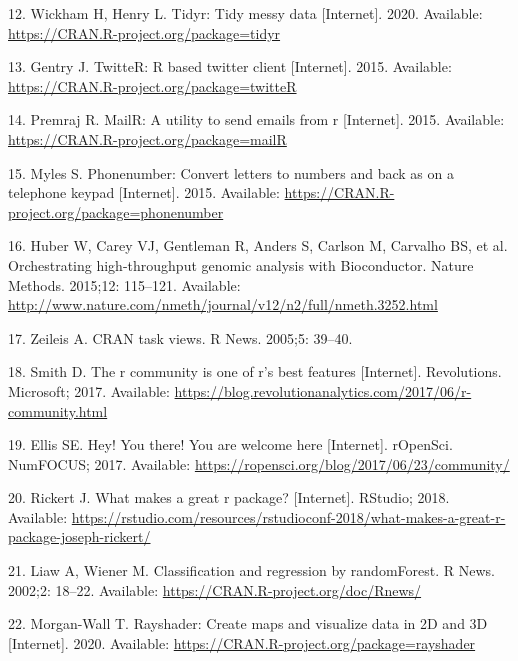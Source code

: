 \documentclass[10pt,letterpaper]{article}
\begin{document}
\leavevmode\hypertarget{ref-tidyr}{}%
12. Wickham H, Henry L. Tidyr: Tidy messy data {[}Internet{]}. 2020.
Available: \url{https://CRAN.R-project.org/package=tidyr}

\leavevmode\hypertarget{ref-twitteR}{}%
13. Gentry J. TwitteR: R based twitter client {[}Internet{]}. 2015.
Available: \url{https://CRAN.R-project.org/package=twitteR}

\leavevmode\hypertarget{ref-mailR}{}%
14. Premraj R. MailR: A utility to send emails from r {[}Internet{]}.
2015. Available: \url{https://CRAN.R-project.org/package=mailR}

\leavevmode\hypertarget{ref-phonenumber}{}%
15. Myles S. Phonenumber: Convert letters to numbers and back as on a
telephone keypad {[}Internet{]}. 2015. Available:
\url{https://CRAN.R-project.org/package=phonenumber}

\leavevmode\hypertarget{ref-bioCproject}{}%
16. Huber W, Carey VJ, Gentleman R, Anders S, Carlson M, Carvalho BS, et
al. Orchestrating high-throughput genomic analysis with Bioconductor.
Nature Methods. 2015;12: 115--121. Available:
\url{http://www.nature.com/nmeth/journal/v12/n2/full/nmeth.3252.html}

\leavevmode\hypertarget{ref-zeileis2005}{}%
17. Zeileis A. CRAN task views. R News. 2005;5: 39--40.

\leavevmode\hypertarget{ref-smith2017}{}%
18. Smith D. The r community is one of r's best features {[}Internet{]}.
Revolutions. Microsoft; 2017. Available:
\url{https://blog.revolutionanalytics.com/2017/06/r-community.html}

\leavevmode\hypertarget{ref-ellis2017}{}%
19. Ellis SE. Hey! You there! You are welcome here {[}Internet{]}.
rOpenSci. NumFOCUS; 2017. Available:
\url{https://ropensci.org/blog/2017/06/23/community/}

\leavevmode\hypertarget{ref-rickert2018}{}%
20. Rickert J. What makes a great r package? {[}Internet{]}. RStudio;
2018. Available:
\url{https://rstudio.com/resources/rstudioconf-2018/what-makes-a-great-r-package-joseph-rickert/}

\leavevmode\hypertarget{ref-randomforest}{}%
21. Liaw A, Wiener M. Classification and regression by randomForest. R
News. 2002;2: 18--22. Available:
\url{https://CRAN.R-project.org/doc/Rnews/}

\leavevmode\hypertarget{ref-rayshader}{}%
22. Morgan-Wall T. Rayshader: Create maps and visualize data in 2D and
3D {[}Internet{]}. 2020. Available:
\url{https://CRAN.R-project.org/package=rayshader}
\end{document}

